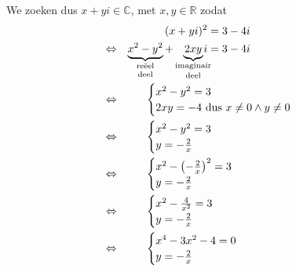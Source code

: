 \documentclass[12pt,twoside,a4paper]{article}
\begin{document}
We zoeken dus $x+yi \in \mathbb{C}$, met $x,y\in\mathbb{R}$ zodat
\begin{align*}
  &&(x+yi)^2 &= 3-4i\\
  \lra &&\underbrace{x^2 - y^2}_{\text{\shortstack{reëel\\deel}}} + \underbrace{2xy}_{\text{\shortstack{imaginair\\deel}}}\hspace*{-0.3cm}i &= 3-4i\\
  \lra && &\hspace*{-2cm}\begin{cases}x^2 - y^2 = 3\\2xy =  -4 \mbox{ dus } x\neq 0 \wedge y\neq 0 \end{cases}\\
  \lra && &\hspace*{-2cm}\begin{cases}x^2 - y^2 = 3\\y =  -\frac{2}{x}\end{cases}\\
  \lra && &\hspace*{-2cm}\begin{cases}x^2 - \left(-\frac{2}{x}\right)^2 = 3\\y =  -\frac{2}{x}\end{cases}\\
  \lra && &\hspace*{-2cm}\begin{cases}x^2 - \frac{4}{x^2} = 3\\y =  -\frac{2}{x}\end{cases}\\
  \lra && &\hspace*{-2cm}\begin{cases}x^4-3x^2-4=0\\y =  -\frac{2}{x}\end{cases}
\end{align*}
\end{document}

